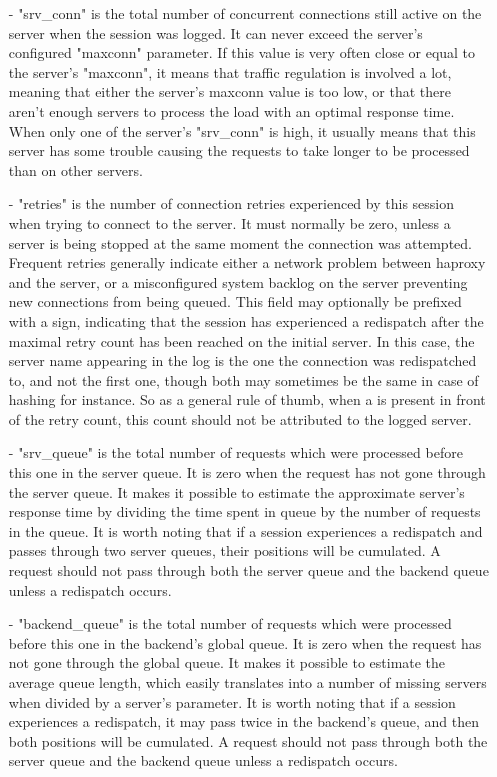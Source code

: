 \begin{itemize}
\item[-]
    "srv\_conn" is the total number of concurrent connections still active on
    the server when the session was logged. It can never exceed the server's
    configured "maxconn" parameter. If this value is very often close or equal
    to the server's "maxconn", it means that traffic regulation is involved a
    lot, meaning that either the server's maxconn value is too low, or that
    there aren't enough servers to process the load with an optimal response
    time. When only one of the server's "srv\_conn" is high, it usually means
    that this server has some trouble causing the requests to take longer to be
    processed than on other servers.

\item[-]
    "retries" is the number of connection retries experienced by this session
    when trying to connect to the server. It must normally be zero, unless a
    server is being stopped at the same moment the connection was attempted.
    Frequent retries generally indicate either a network problem between
    haproxy and the server, or a misconfigured system backlog on the server
    preventing new connections from being queued. This field may optionally be
    prefixed with a \chr{+} sign, indicating that the session has experienced a
    redispatch after the maximal retry count has been reached on the initial
    server. In this case, the server name appearing in the log is the one the
    connection was redispatched to, and not the first one, though both may
    sometimes be the same in case of hashing for instance. So as a general rule
    of thumb, when a \chr{+} is present in front of the retry count, this count
    should not be attributed to the logged server.

\item[-]
    "srv\_queue" is the total number of requests which were processed before
    this one in the server queue. It is zero when the request has not gone
    through the server queue. It makes it possible to estimate the approximate
    server's response time by dividing the time spent in queue by the number of
    requests in the queue. It is worth noting that if a session experiences a
    redispatch and passes through two server queues, their positions will be
    cumulated. A request should not pass through both the server queue and the
    backend queue unless a redispatch occurs.

\item[-]
    "backend\_queue" is the total number of requests which were processed before
    this one in the backend's global queue. It is zero when the request has not
    gone through the global queue. It makes it possible to estimate the average
    queue length, which easily translates into a number of missing servers when
    divided by a server's  parameter. It is worth noting that if a
    session experiences a redispatch, it may pass twice in the backend's queue,
    and then both positions will be cumulated. A request should not pass
    through both the server queue and the backend queue unless a redispatch
    occurs.


\end{itemize}
